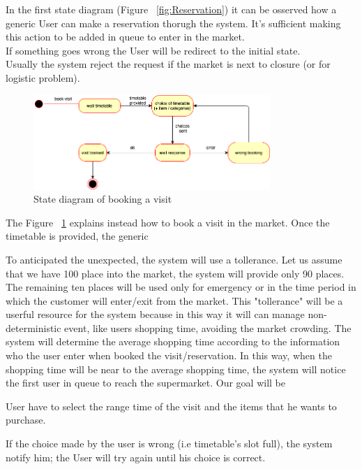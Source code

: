 In the  first state diagram (Figure ~\ref{fig:Reservation}) it can be osserved how a generic User can make a reservation thorugh the system. It's sufficient making this action to be added in queue to enter in the market.
\\If something goes wrong the User will be redirect to the initial state.
\\Usually the system reject the request if the market is next to closure (or for logistic problem).

\par 
\medskip

\begin{figure}[h]
  \caption{State diagram of booking a visit}
  \label{fig:Visit}
  \centering
  \includegraphics[width=0.8\textwidth, height=0.4\textwidth]{diagrams/2-visit.png}
\end{figure}

\par 
\medskip

The Figure ~\ref{fig:Visit} explains instead how to book a visit in the market. Once the timetable is provided, the generic 



To anticipated the unexpected, the system will use a tollerance.
Let us assume that we have 100 place into the market, the system will provide only 90 places.
The remaining ten places will be used only for emergency or in the time period in which the customer will enter/exit from the market.
This "tollerance" will be a userful resource for the system because in this way it will can manage non-deterministic event, like users shopping time, avoiding the market crowding. 
The system will determine the average shopping time according to the information who the user enter when booked the visit/reservation.
In this way, when the shopping time will be near to the average shopping time, the system will notice the first user in queue to reach the supermarket.  
Our goal will be 


User have to select the range time of the visit and the items that he wants to purchase. \par If the choice made by the user is wrong (i.e timetable's slot full), the system notify him; the User will try again until his choice is correct.
\par 
\medskip


